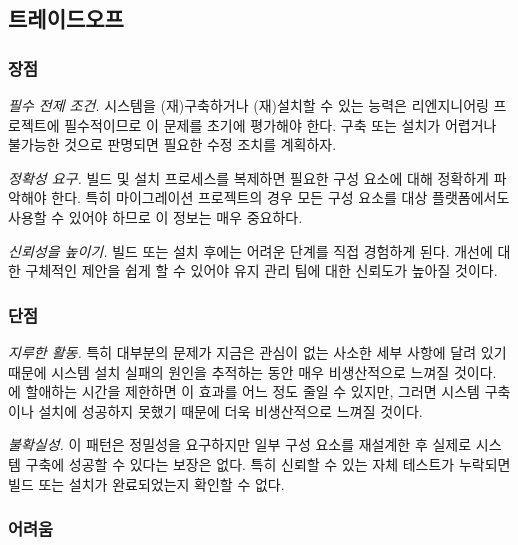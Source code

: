 \documentclass[a4paper,10pt,twoside]{book}
\begin{document}
\subsection*{트레이드오프}

\subsubsection*{장점}

\begin{bulletlist}
  \item \emph{필수 전제 조건.}
시스템을 (재)구축하거나 (재)설치할 수 있는 능력은 리엔지니어링 프로젝트에 필수적이므로 이 문제를 초기에 평가해야 한다. 구축 또는 설치가 어렵거나 불가능한 것으로 판명되면 필요한 수정 조치를 계획하자.

  \item \emph{정확성 요구.}
빌드 및 설치 프로세스를 복제하면 필요한 구성 요소에 대해 정확하게 파악해야 한다. 특히 마이그레이션 프로젝트의 경우 모든 구성 요소를 대상 플랫폼에서도 사용할 수 있어야 하므로 이 정보는 매우 중요하다.

  \item \emph{신뢰성을 높이기.}
빌드 또는 설치 후에는 어려운 단계를 직접 경험하게 된다. 개선에 대한 구체적인 제안을 쉽게 할 수 있어야 유지 관리 팀에 대한 신뢰도가 높아질 것이다.
\end{bulletlist}

\subsubsection*{단점}

\begin{bulletlist}
  \item \emph{지루한 활동.}
특히 대부분의 문제가 지금은 관심이 없는 사소한 세부 사항에 달려 있기 때문에 시스템 설치 실패의 원인을 추적하는 동안 매우 비생산적으로 느껴질 것이다. 에 할애하는 시간을 제한하면 이 효과를 어느 정도 줄일 수 있지만, 그러면 시스템 구축이나 설치에 성공하지 못했기 때문에 더욱 비생산적으로 느껴질 것이다.

  \item \emph{불확실성.}
이 패턴은 정밀성을 요구하지만 일부 구성 요소를 재설계한 후 실제로 시스템 구축에 성공할 수 있다는 보장은 없다. 특히 신뢰할 수 있는 자체 테스트가 누락되면 빌드 또는 설치가 완료되었는지 확인할 수 없다.
\end{bulletlist}

\subsubsection*{어려움}
\end{document}
